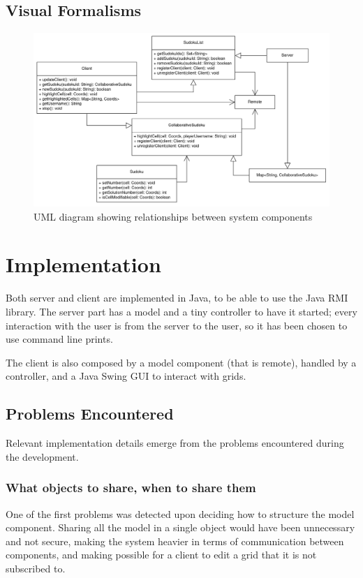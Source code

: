 \documentclass[12pt, a4paper]{report}
\begin{document}
\section{Visual Formalisms}
\begin{figure}
    \centering
    \includegraphics[scale=0.25]{class-diagram.png}
    \caption{UML diagram showing relationships between system components}
\end{figure}

\chapter{Implementation}
Both server and client are implemented in Java, to be able to use the Java RMI
 library. The server part has a model and a tiny controller to have it started;
 every interaction with the user is from the server to the user, so it has been
 chosen to use command line prints. %
 
The client is also composed by a model component (that is remote),
 handled by a controller, and a Java Swing GUI to interact with grids.

\section{Problems Encountered}
Relevant implementation details emerge from the problems encountered during the
 development.

\subsection{What objects to share, when to share them}
One of the first problems was detected upon deciding how to structure the model
 component. Sharing all the model in a single object would have been unnecessary
 and not secure, making the system heavier in terms of communication between
 components, and making possible for a client to edit a grid that it is not
 subscribed to.
\end{document}
